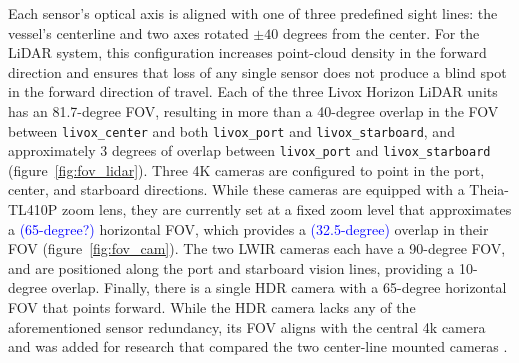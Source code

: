 \documentclass{erauthesis}
\begin{document}
Each sensor’s optical axis is aligned with one of three predefined sight lines: the vessel's centerline and two axes rotated $\pm 40$ degrees from the center.
For the LiDAR system, this configuration increases point-cloud density in the forward direction and ensures that loss of any single sensor does not produce a blind spot in the forward direction of travel.
Each of the three Livox Horizon LiDAR units has an 81.7-degree \ac{FOV}, resulting in more than a 40-degree overlap in the \ac{FOV} between \texttt{livox\_center} and both \texttt{livox\_port} and \texttt{livox\_starboard}, and approximately 3 degrees of overlap between \texttt{livox\_port} and \texttt{livox\_starboard} (figure~\ref{fig:fov_lidar}).
Three 4K cameras are configured to point in the port, center, and starboard directions. 
While these cameras are equipped with a Theia-TL410P zoom lens, they are currently set at a fixed zoom level that approximates a \textcolor{blue}{(65-degree?)} horizontal \ac{FOV}, which provides a \textcolor{blue}{(32.5-degree)} overlap in their \ac{FOV} (figure~\ref{fig:fov_cam}).
The two \ac{LWIR} cameras each have a 90-degree \acs{FOV}, and are positioned along the port and starboard vision lines, providing a 10-degree overlap.
Finally, there is a single HDR camera with a 65-degree horizontal \ac{FOV} that points forward.
While the \ac{HDR} camera lacks any of the aforementioned sensor redundancy, its \ac{FOV} aligns with the central 4k camera and was added for research that compared the two center-line mounted cameras \cite{liebergall}.

\end{document}
